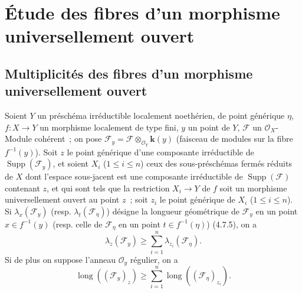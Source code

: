 \section{Étude des fibres d'un morphisme universellement ouvert}
\label{section:IV.15-fr}

\subsection{Multiplicités des fibres d'un morphisme universellement ouvert}
\label{subsection:IV.15.1-fr}

\begin{proposition}[15.1.1]
\label{IV.15.1.1-fr}
Soient $Y$ un préschéma irréductible localement noethérien, de point générique
$\eta$, $f:X\to Y$ un morphisme localement de type fini, $y$ un point de $Y$,
$\mathcal F$ un $\mathcal O_X$-Module cohérent~; on pose
$\mathcal F_y=\mathcal F\otimes_{\mathcal O_Y}\mathbf{k}(y)$ (faisceau de modules
sur la fibre $f^{-1}(y)$). Soit $z$ le point générique d'une composante
irréductible de $\operatorname{Supp}(\mathcal F_y)$, et soient $X_i$
($1\leqslant i\leqslant n$) ceux des sous-préschémas fermés réduits de $X$ dont
l'espace sous-jacent est une composante irréductible de
$\operatorname{Supp}(\mathcal F)$ contenant $z$, et qui sont tels que la
restriction $X_i\to Y$ de $f$ soit un morphisme universellement ouvert au point
$z$~; soit $z_i$ le point générique de $X_i$ ($1\leqslant i\leqslant n$). Si
$\lambda_x(\mathcal F_y)$ (resp. $\lambda_t(\mathcal F_\eta)$) désigne la longueur
géométrique de $\mathcal F_y$ en un point $x\in f^{-1}(y)$ (resp. celle de
$\mathcal F_\eta$ en un point $t\in f^{-1}(\eta)$) (4.7.5), on a
\[
\tag{15.1.1.1}
\label{IV.15.1.1.1-fr}
  \lambda_z(\mathcal F_y)\geqslant
  \sum_{i=1}^{n}\lambda_{z_i}(\mathcal F_\eta).
\]
Si de plus on suppose l'anneau $\mathcal O_y$ régulier, on a
\[
\tag{15.1.1.2}
\label{IV.15.1.1.2-fr}
  \operatorname{long}((\mathcal F_y)_z)\geqslant
  \sum_{i=1}^{n}\operatorname{long}((\mathcal F_\eta)_{z_i}).
\]
\end{proposition}


